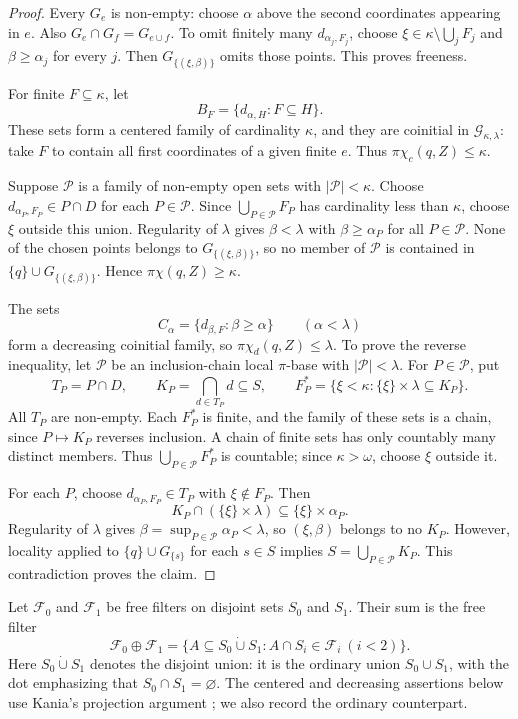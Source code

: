 \documentclass[10pt,a4paper]{amsart}
\theoremstyle{definition}
\theoremstyle{remark}
\newcommand{\F}{\mathcal F}
\newcommand{\G}{\mathcal G}
\newcommand{\pc}{\pi\chi}
\newcommand{\pcc}{\pi\chi_c}
\newcommand{\pcd}{\pi\chi_d}
\begin{document}
\begin{proof}
Every $G_e$ is non-empty: choose $\alpha$ above the second coordinates appearing in $e$. Also $G_e\cap G_f=G_{e\cup f}$. To omit finitely many $d_{\alpha_j,F_j}$, choose $\xi\in\kappa\setminus\bigcup_jF_j$ and $\beta\geqslant\alpha_j$ for every $j$. Then $G_{\{(\xi,\beta)\}}$ omits those points. This proves freeness.

For finite $F\subseteq\kappa$, let
\[
B_F=\{d_{\alpha,H}:F\subseteq H\}.
\]
These sets form a centered family of cardinality $\kappa$, and they are coinitial in $\G_{\kappa,\lambda}$: take $F$ to contain all first coordinates of a given finite $e$. Thus $\pcc(q,Z)\leqslant\kappa$.

Suppose $\mathcal P$ is a family of non-empty open sets with $|\mathcal P|<\kappa$. Choose $d_{\alpha_P,F_P}\in P\cap D$ for each $P\in\mathcal P$. Since $\bigcup_{P\in\mathcal P}F_P$ has cardinality less than $\kappa$, choose $\xi$ outside this union. Regularity of $\lambda$ gives $\beta<\lambda$ with $\beta\geqslant\alpha_P$ for all $P\in\mathcal P$. None of the chosen points belongs to $G_{\{(\xi,\beta)\}}$, so no member of $\mathcal P$ is contained in $\{q\}\cup G_{\{(\xi,\beta)\}}$. Hence $\pc(q,Z)\geqslant\kappa$.

The sets
\[
C_\alpha=\{d_{\beta,F}:\beta\geqslant\alpha\}\qquad(\alpha<\lambda)
\]
form a decreasing coinitial family, so $\pcd(q,Z)\leqslant\lambda$. To prove the reverse inequality, let $\mathcal P$ be an inclusion-chain local $\pi$-base with $|\mathcal P|<\lambda$. For $P\in\mathcal P$, put
\[
T_P=P\cap D,\qquad K_P=\bigcap_{d\in T_P}d\subseteq S,
\qquad F_P^*=\{\xi<\kappa:\{\xi\}\times\lambda\subseteq K_P\}.
\]
All $T_P$ are non-empty. Each $F_P^*$ is finite, and the family of these sets is a chain, since $P\mapsto K_P$ reverses inclusion. A chain of finite sets has only countably many distinct members. Thus $\bigcup_{P\in\mathcal P}F_P^*$ is countable; since $\kappa>\omega$, choose $\xi$ outside it.

For each $P$, choose $d_{\alpha_P,F_P}\in T_P$ with $\xi\notin F_P$. Then
\[
K_P\cap(\{\xi\}\times\lambda)\subseteq\{\xi\}\times\alpha_P.
\]
Regularity of $\lambda$ gives $\beta=\sup_{P\in\mathcal P}\alpha_P<\lambda$, so $(\xi,\beta)$ belongs to no $K_P$. However, locality applied to $\{q\}\cup G_{\{s\}}$ for each $s\in S$ implies $S=\bigcup_{P\in\mathcal P}K_P$. This contradiction proves the claim.
\end{proof}

Let $\F_0$ and $\F_1$ be free filters on disjoint sets $S_0$ and $S_1$. Their sum is the free filter
\[
\F_0\oplus\F_1=
\{A\subseteq S_0\mathbin{\dot\cup}S_1:A\cap S_i\in\F_i\ (i<2)\}.
\]
Here $S_0\mathbin{\dot\cup}S_1$ denotes the disjoint union: it is the ordinary union $S_0\cup S_1$, with the dot emphasizing that $S_0\cap S_1=\varnothing$.
The centered and decreasing assertions below use Kania's projection argument
\cite[Lemma 2.7]{Kania}; we also record the ordinary counterpart.
\end{document}
